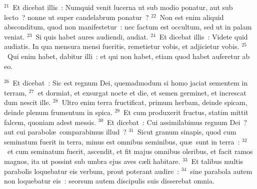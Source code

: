 ${}^{21}$~Et dicebat illis~: Numquid venit lucerna ut sub modio ponatur, aut sub lecto~? nonne ut super candelabrum ponatur~?
${}^{22}$~Non est enim aliquid absconditum, quod non manifestetur~: nec factum est occultum, sed ut in palam veniat.
${}^{23}$~Si quis habet aures audiendi, audiat.
${}^{24}$~Et dicebat illis~: Videte quid audiatis. In qua mensura mensi fueritis, remetietur vobis, et adjicietur vobis.
${}^{25}$~Qui enim habet, dabitur illi~: et qui non habet, etiam quod habet auferetur ab eo.


${}^{26}$~Et dicebat~: Sic est regnum Dei, quemadmodum si homo jaciat sementem in terram,
${}^{27}$~et dormiat, et exsurgat nocte et die, et semen germinet, et increscat dum nescit ille.
${}^{28}$~Ultro enim terra fructificat, primum herbam, deinde spicam, deinde plenum frumentum in spica.
${}^{29}$~Et cum produxerit fructus, statim mittit falcem, quoniam adest messis.
${}^{30}$~Et dicebat~: Cui assimilabimus regnum Dei~? aut cui parabol\ae\ comparabimus illud~?
${}^{31}$~Sicut granum sinapis, quod cum seminatum fuerit in terra, minus est omnibus seminibus, qu\ae\ sunt in terra~:
${}^{32}$~et cum seminatum fuerit, ascendit, et fit majus omnibus oleribus, et facit ramos magnos, ita ut possint sub umbra ejus aves c\ae li habitare.
${}^{33}$~Et talibus multis parabolis loquebatur eis verbum, prout poterant audire~:
${}^{34}$~sine parabola autem non loquebatur eis~: seorsum autem discipulis suis disserebat omnia.


